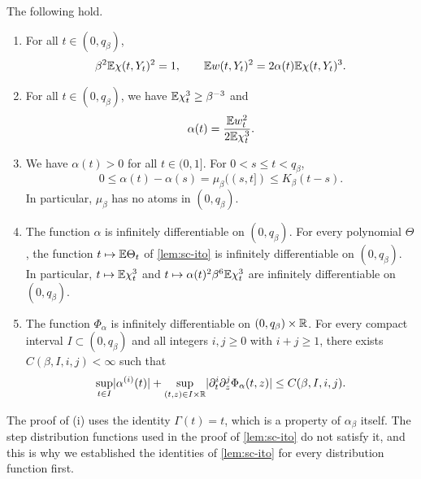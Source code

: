 \begin{lemma}
\label{b:lem:os-scalar-jets}
The following hold.
\begin{enumerate}[label=\textup{(\roman*)}]
\item For all $t\in(0,q_\beta)$,
  \begin{equation}\label{b:eq:contacts}\csname ltx@label\endcsname{b:eq:os-contacts}
   \beta^2\E\chi(t,Y_t)^2=1,\qquad
   \E w(t,Y_t)^2=2\alpha(t)\E\chi(t,Y_t)^3.
  \end{equation}
\item For all $t\in(0,q_\beta)$, we have $\mathbb E\chi_t^3\ge\beta^{-3}$ and
  \begin{equation}\label{eq:sc-quotient}
   \alpha(t)=\frac{\mathbb E w_t^2}{2\mathbb E\chi_t^3}.
  \end{equation}
\item We have $\alpha(t)>0$ for all $t\in(0,1]$. For
  $0<s\le t<q_\beta$,
  \[
   0\le\alpha(t)-\alpha(s)=\mu_\beta((s,t])\le K_\beta(t-s).
  \]
  In particular, $\mu_\beta$ has no atoms in $(0,q_\beta)$.
\item The function $\alpha$ is infinitely differentiable on $(0,q_\beta)$.
  For every polynomial $\Theta$, the function $t\mapsto\mathbb E\Theta_t$ of
  \cref{lem:sc-ito} is infinitely differentiable on $(0,q_\beta)$. In
  particular, $t\mapsto\mathbb E\chi_t^3$ and
  $t\mapsto\alpha(t)^2\beta^6\mathbb E\chi_t^3$ are infinitely differentiable on
  $(0,q_\beta)$.
\item The function $\Phi_\alpha$ is infinitely differentiable on
  $(0,q_\beta)\times\mathbb R$. For every compact interval $I\subset(0,q_\beta)$
  and all integers $i,j\ge0$ with $i+j\ge1$, there exists
  $C(\beta,I,i,j)<\infty$ such that
  \[
   \sup_{t\in I}\lvert \alpha^{(i)}(t)\rvert
   +\sup_{(t,z)\in I\times\mathbb R}\lvert \partial_t^i\partial_z^j\Phi_\alpha(t,z)\rvert
   \le C(\beta,I,i,j).
  \]
\end{enumerate}
\end{lemma}

The proof of (i) uses the identity $\Gamma(t)=t$, which is a property of
$\alpha_\beta$ itself. The step distribution functions used in the proof of
\cref{lem:sc-ito} do not satisfy it, and this is why we established the
identities of \cref{lem:sc-ito} for every distribution function first.

